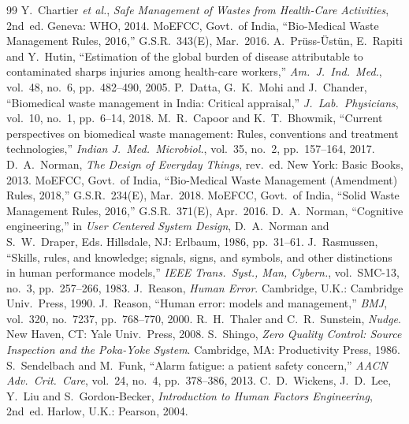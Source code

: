 \documentclass[10pt,twocolumn,a4paper]{article}
\begin{document}
\begin{thebibliography}{99}\fontsize{6.8}{7.8}\selectfont
\setlength{\itemsep}{-1.2pt}
 Y.\ Chartier \emph{et al.}, \emph{Safe Management of Wastes from Health-Care Activities}, 2nd~ed. Geneva: WHO, 2014.
 MoEFCC, Govt.\ of India, ``Bio-Medical Waste Management Rules, 2016,'' G.S.R.~343(E), Mar.~2016.
 A.\ Pr\"uss-\"Ust\"un, E.\ Rapiti and Y.\ Hutin, ``Estimation of the global burden of disease attributable to contaminated sharps injuries among health-care workers,'' \emph{Am.\ J.\ Ind.\ Med.}, vol.~48, no.~6, pp.~482--490, 2005.
 P.\ Datta, G.\ K.\ Mohi and J.\ Chander, ``Biomedical waste management in India: Critical appraisal,'' \emph{J.\ Lab.\ Physicians}, vol.~10, no.~1, pp.~6--14, 2018.
 M.\ R.\ Capoor and K.\ T.\ Bhowmik, ``Current perspectives on biomedical waste management: Rules, conventions and treatment technologies,'' \emph{Indian J.\ Med.\ Microbiol.}, vol.~35, no.~2, pp.~157--164, 2017.
 D.\ A.\ Norman, \emph{The Design of Everyday Things}, rev.\ ed. New York: Basic Books, 2013.
 MoEFCC, Govt.\ of India, ``Bio-Medical Waste Management (Amendment) Rules, 2018,'' G.S.R.~234(E), Mar.~2018.
 MoEFCC, Govt.\ of India, ``Solid Waste Management Rules, 2016,'' G.S.R.~371(E), Apr.~2016.
 D.\ A.\ Norman, ``Cognitive engineering,'' in \emph{User Centered System Design}, D.\ A.\ Norman and S.\ W.\ Draper, Eds. Hillsdale, NJ: Erlbaum, 1986, pp.~31--61.
 J.\ Rasmussen, ``Skills, rules, and knowledge; signals, signs, and symbols, and other distinctions in human performance models,'' \emph{IEEE Trans.\ Syst., Man, Cybern.}, vol.~SMC-13, no.~3, pp.~257--266, 1983.
 J.\ Reason, \emph{Human Error}. Cambridge, U.K.: Cambridge Univ.\ Press, 1990.
 J.\ Reason, ``Human error: models and management,'' \emph{BMJ}, vol.~320, no.~7237, pp.~768--770, 2000.
 R.\ H.\ Thaler and C.\ R.\ Sunstein, \emph{Nudge}. New Haven, CT: Yale Univ.\ Press, 2008.
 S.\ Shingo, \emph{Zero Quality Control: Source Inspection and the Poka-Yoke System}. Cambridge, MA: Productivity Press, 1986.
 S.\ Sendelbach and M.\ Funk, ``Alarm fatigue: a patient safety concern,'' \emph{AACN Adv.\ Crit.\ Care}, vol.~24, no.~4, pp.~378--386, 2013.
 C.\ D.\ Wickens, J.\ D.\ Lee, Y.\ Liu and S.\ Gordon-Becker, \emph{Introduction to Human Factors Engineering}, 2nd~ed. Harlow, U.K.: Pearson, 2004.

\end{thebibliography}
\end{document}
